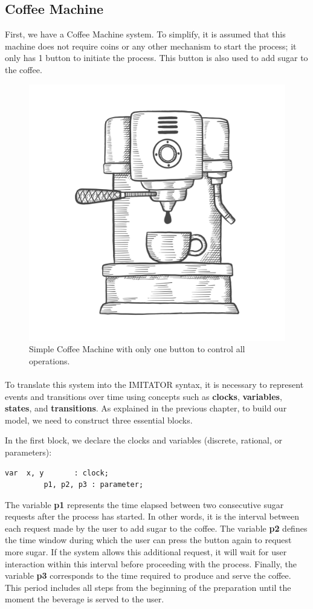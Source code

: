 \subsection{Coffee Machine}

First, we have a Coffee Machine system. To simplify, it is assumed that this machine does not require coins or any other mechanism to start the process; it only has 1 button to initiate the process. This button is also used to add sugar to the coffee.

\begin{figure} [H]
    \centering
    \includegraphics[width=0.4\linewidth]{chapters/vecteezy_coffee-espresso-machine-lover-single-isolated-hand-drawn_8148187.jpg}
    \caption[Simple Coffee Machine with only one button to control all operations.]{Simple Coffee Machine with only one button to control all operations.~\cite{Abate2021}}
    \label{fig:modelcheckingC}
\end{figure}

\paragraph{}

To translate this system into the IMITATOR syntax, it is necessary to represent events and transitions over time using concepts such as \textbf{clocks}, \textbf{variables}, \textbf{states}, and \textbf{transitions}. As explained in the previous chapter, to build our model, we need to construct three essential blocks.

In the first block, we declare the clocks and variables (discrete, rational, or parameters):

\begin{lstlisting}[language=UPPAAL]
    var  x, y       : clock;
         p1, p2, p3 : parameter;
\end{lstlisting}

The variable \textbf{p1} represents the time elapsed between two consecutive sugar requests after the process has started. In other words, it is the interval between each request made by the user to add sugar to the coffee. The variable \textbf{p2} defines the time window during which the user can press the button again to request more sugar. If the system allows this additional request, it will wait for user interaction within this interval before proceeding with the process. Finally, the variable \textbf{p3} corresponds to the time required to produce and serve the coffee. This period includes all steps from the beginning of the preparation until the moment the beverage is served to the user.

